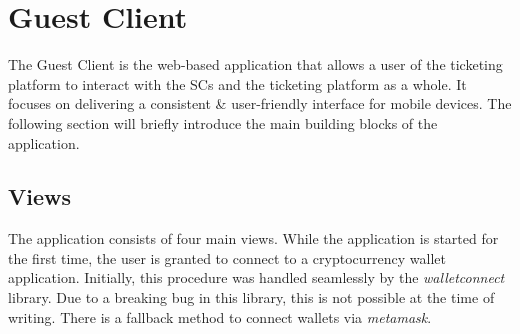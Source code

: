
\section{Guest Client}\label{section:guest client}
The Guest Client is the web-based application that allows a user of the ticketing platform to interact with the SCs and the ticketing platform as a whole. It focuses on delivering a consistent \& user-friendly interface for mobile devices. The following section will briefly introduce the main building blocks of the application.

\subsection{Views}

The application consists of four main views. While the application is started for the first time, the user is granted to connect to a cryptocurrency wallet application. Initially, this procedure was handled seamlessly by the \textit{walletconnect} library. Due to a breaking bug in this library, this is not possible at the time of writing. There is a fallback method to connect wallets via \textit{metamask}.

